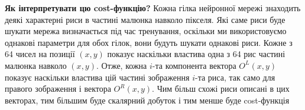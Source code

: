 \documentclass{article}
\theoremstyle{definition}
\begin{document}
\textbf{Як інтерпретувати цю cost-функцію?} Кожна гілка нейронної мережі знаходить деякі характерні риси в частині малюнка навколо пікселя. Які саме риси буде шукати мережа визначається під час тренування, оскільки ми використовуємо однакові параметри для обох гілок, вони будуть шукати однакові риси. Кожне з 64 чисел на позиції $(x, y)$ показує наскільки властива одна з 64 рис частині малюнка навколо $(x,y)$. Отже, кожна $i$-та компонента вектора $O^L(x,y)$ показує наскільки властива цій частині зображення $i$-та риса, так само для правого зображення і вектора $O^R(x,y)$. Чим більш схожі риси описані в цих векторах, тим більшим буде скалярний добуток і тим менше буде cost-функція



\newpage

\printbibliography 
\end{document}
